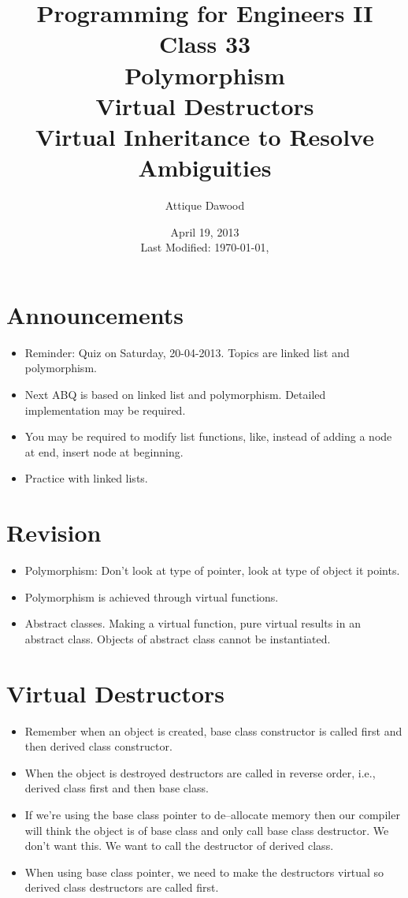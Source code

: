 \documentclass[12pt,a4paper]{article}
\title{\vspace{-2cm}Programming for Engineers II\\Class 33\\Polymorphism\\Virtual Destructors\\Virtual Inheritance to Resolve Ambiguities}
\author{Attique Dawood}
\date{April 19, 2013\\[0.2cm] Last Modified: \today, \currenttime}
\begin{document}
\maketitle
\section{Announcements}
\begin{itemize}
\item Reminder: Quiz on Saturday, 20-04-2013. Topics are linked list and polymorphism.
\item Next ABQ is based on linked list and polymorphism. Detailed implementation may be required.
\item You may be required to modify list functions, like, instead of adding a node at end, insert node at beginning.
\item Practice with linked lists.
\end{itemize}
\section{Revision}
\begin{itemize}
\item Polymorphism: Don't look at type of pointer, look at type of object it points.
\item Polymorphism is achieved through virtual functions.
\item Abstract classes. Making a virtual function, pure virtual results in an abstract class. Objects of abstract class cannot be instantiated.
\end{itemize}
\section{Virtual Destructors}
\begin{itemize}
\item Remember when an object is created, base class constructor is called first and then derived class constructor. \item When the object is destroyed destructors are called in reverse order, i.e., derived class first and then base class.
\item If we're using the base class pointer to de--allocate memory then our compiler will think the object is of base class and only call base class destructor. We don't want this. We want to call the destructor of derived class.
\item When using base class pointer, we need to make the destructors virtual so derived class destructors are called first.
\end{itemize}
\end{document}
